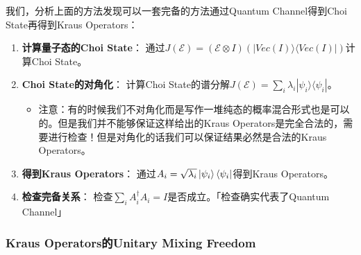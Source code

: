 我们，分析上面的方法发现可以一套完备的方法通过Quantum Channel得到Choi State再得到Kraus Operators：
\begin{enumerate}
  \item \textbf{计算量子态的Choi State}： 通过$ J(\mathcal{E}) = (\mathcal{E} \otimes I)(|Vec(I)\rangle\langle Vec(I)|) $计算Choi State。
  \item \textbf{Choi State的对角化}： 计算Choi State的谱分解$ J(\mathcal{E}) = \sum_i \lambda_i |\psi_i\rangle\langle \psi_i| $。
    \begin{itemize}
      \item 注意：有的时候我们不对角化而是写作一堆纯态的概率混合形式也是可以的。但是我们并不能够保证这样给出的Kraus Operators是完全合法的，需要进行检查！但是对角化的话我们可以保证结果必然是合法的Kraus Operators。
    \end{itemize}
  \item \textbf{得到Kraus Operators}： 通过$ A_i = \sqrt{\lambda_i} \left| \psi_i \right\rangle\left\langle \psi_i \right| $得到Kraus Operators。
  \item \textbf{检查完备关系}： 检查$ \sum_i A_i^\dagger A_i = I $是否成立。「检查确实代表了Quantum Channel」
\end{enumerate}

\subsubsection{Kraus Operators的Unitary Mixing Freedom}

\bigskip
{}


